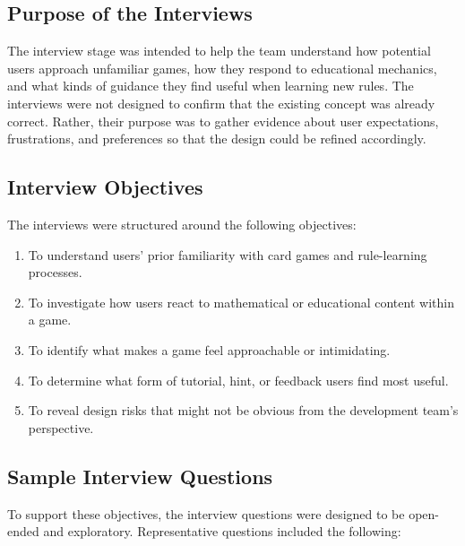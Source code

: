 \documentclass[12pt]{article}
\begin{document}
    \subsection{Purpose of the Interviews}

    The interview stage was intended to help the team understand how potential users approach unfamiliar games, how they respond to educational mechanics, and what kinds of guidance they find useful when learning new rules. The interviews were not designed to confirm that the existing concept was already correct. Rather, their purpose was to gather evidence about user expectations, frustrations, and preferences so that the design could be refined accordingly.

    \subsection{Interview Objectives}

    The interviews were structured around the following objectives:

    \begin{enumerate}[leftmargin=2em]
        \item To understand users' prior familiarity with card games and rule-learning processes.
        \item To investigate how users react to mathematical or educational content within a game.
        \item To identify what makes a game feel approachable or intimidating.
        \item To determine what form of tutorial, hint, or feedback users find most useful.
        \item To reveal design risks that might not be obvious from the development team's perspective.
    \end{enumerate}

    \subsection{Sample Interview Questions}

    To support these objectives, the interview questions were designed to be open-ended and exploratory. Representative questions included the following:
\end{document}
